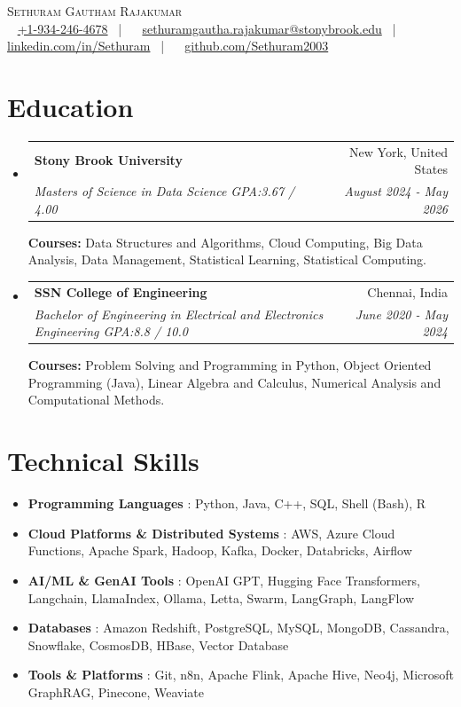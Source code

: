 \documentclass[a4paper,10pt]{article}
\makeatletter
\newcommand{\resumeItem}[2]{
  \item\small{
    \textbf{#1}{ : #2 \vspace{-2pt}}
  }
}
\newcommand{\resumeSubheading}[4]{
  \vspace{-1pt}\item
    \begin{tabular*}{0.97\textwidth}{l@{\extracolsep{\fill}}r}
      \textbf{#1} & #2 \\
      \textit{#3} & \textit{#4} \\
    \end{tabular*}\vspace{-3pt}
}
\newcommand{\resumeSubItem}[2]{\resumeItem{#1}{#2}\vspace{-3pt}}
\newcommand{\resumeSubHeadingListStart}{\begin{itemize}[leftmargin=*]}
\newcommand{\resumeSubHeadingListEnd}{\end{itemize}}
\makeatother
\begin{document}
\begin{center}
    {\Huge \scshape Sethuram Gautham Rajakumar} \\[8pt]
    \small
    \faPhone ~ \href{tel:+1-934-246-4678}{+1-934-246-4678} ~|~ 
    \faEnvelope ~ \href{mailto:sethuramgautha.rajakumar@stonybrook.edu}{sethuramgautha.rajakumar@stonybrook.edu} ~|~ 
    \faLinkedin ~ \href{https://linkedin.com/in/Sethuram}{linkedin.com/in/Sethuram} ~|~ 
    \faGithub ~ \href{https://github.com/Sethuram2003}{github.com/Sethuram2003}
\end{center}

\section{Education}
  \resumeSubHeadingListStart

    \resumeSubheading
      {Stony Brook University}{New York, United States}
      {Masters of Science in Data Science GPA:3.67 / 4.00}{August 2024 - May 2026}

      \textbf{Courses:}
        Data Structures and Algorithms, Cloud Computing, Big Data Analysis, Data Management, Statistical Learning, Statistical Computing.
    \resumeSubheading
      {SSN College of Engineering}{Chennai, India}
      {Bachelor of Engineering in Electrical and Electronics Engineering GPA:8.8 / 10.0}{June 2020 - May 2024}

      \textbf{Courses:}
        Problem Solving and Programming in Python, Object Oriented Programming (Java), Linear Algebra and Calculus, Numerical Analysis and Computational Methods.
  \resumeSubHeadingListEnd

\section{Technical Skills}
  \resumeSubHeadingListStart

    \resumeSubItem{Programming Languages}{Python, Java, C++, SQL, Shell (Bash), R}
    \resumeSubItem{Cloud Platforms \& Distributed Systems}{AWS, Azure Cloud Functions, Apache Spark, Hadoop, Kafka, Docker, Databricks, Airflow}
    \resumeSubItem{AI/ML \& GenAI Tools}{OpenAI GPT, Hugging Face Transformers, Langchain, LlamaIndex, Ollama, Letta, Swarm, LangGraph, LangFlow}
    \resumeSubItem{Databases}{Amazon Redshift, PostgreSQL, MySQL, MongoDB, Cassandra, Snowflake, CosmosDB, HBase, Vector Database}
    \resumeSubItem{Tools \& Platforms}{Git, n8n, Apache Flink, Apache Hive, Neo4j, Microsoft GraphRAG, Pinecone, Weaviate}
  \resumeSubHeadingListEnd
\end{document}
